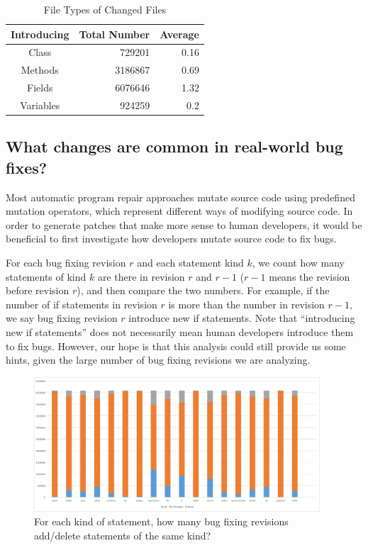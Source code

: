 \documentclass{sig-alternate-05-2015}
\newcommand{\todo}[1]
  {{\scriptsize \textbf{\color{red} {#1}}}}
\begin{document}
\begin{table}
\centering
  \begin{tabular}{| c | r | r |}
  \hline
  Introducing & Total Number & Average \\ \hline \hline
  Class & 729201 & 0.16 \\ \hline
  Methods & 3186867 & 0.69 \\ \hline
  Fields & 6076646 & 1.32 \\ \hline
  Variables & 924259 & 0.2 \\ \hline
  \end{tabular}
  \caption{File Types of Changed Files}
  \label{tbl:new}
\end{table}



\subsection{What changes are common in real-world bug fixes?}

Most automatic program repair approaches mutate source code using predefined
mutation operators, which represent different ways of modifying source code. In
order to generate patches that make more sense to human developers, it would be
beneficial to first investigate how developers mutate source code to fix bugs. 

For each bug fixing revision $r$ and each statement kind $k$, we count how many
statements of kind $k$ are there in revision $r$ and $r-1$ ($r-1$ means the
revision before revision $r$), and then compare the two numbers. For example, if
the number of if statements in revision $r$ is more than the number in revision
$r-1$, we say bug fixing revision $r$ introduce new if statements. Note that
``introducing new if statements'' does not necessarily mean human developers
introduce them to fix bugs. However, our hope is that this analysis could still
provide us some hints, given the large number of bug fixing revisions we are
analyzing.

\begin{figure}[!t] \centering
	\includegraphics[width=0.95\textwidth]{StmtType} \caption{For each kind
	of statement, how many bug fixing revisions add/delete statements of the
same kind?} \label{fig:StmtType} \end{figure}
\end{document}
